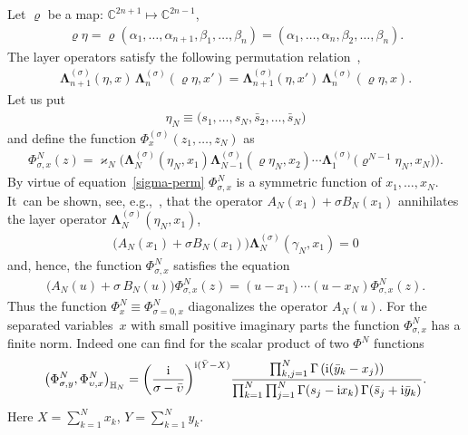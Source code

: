 \documentclass[pdftex]{sigma}%
\numberwithin{equation}{section}
\begin{document}
Let $\varrho$ be a map: $\mathbb C^{2n+1}\mapsto \mathbb C^{2n-1}$,
\begin{gather*}
\varrho\eta=\varrho(\alpha_1,\dots,\alpha_{n+1},\beta_{1},\dots,\beta_n)
=(\alpha_1,\dots,\alpha_n,\beta_{2},\dots,\beta_{n}).
\end{gather*}
The layer operators satisfy the following permutation relation~\cite{Belitsky:2014rba},
\begin{gather}\label{sigma-perm}
\boldsymbol\Lambda^{(\sigma)}_{n+1}(\eta,x)\,\boldsymbol\Lambda^{(\sigma)}_n(\varrho\eta,x')
 =\boldsymbol\Lambda^{(\sigma)}_{n+1}(\eta,x')\,\boldsymbol\Lambda^{(\sigma)}_n(\varrho\eta,x).
\end{gather}
Let us put
\begin{gather}\label{gammaNAB}
\eta_N\equiv\big( s_1,\dots, s_N, \bar s_2,\dots, \bar s_N\big)
\end{gather}
and define the function $\Phi^{(\sigma)}_{{x}}(z_1,\dots,z_N)$ as
\begin{gather*}%
 \Phi^{N}_{\sigma,{x}}(z)=\varkappa_N \Big( \boldsymbol\Lambda^{(\sigma)}_N(\eta_N, x_1)
 \boldsymbol\Lambda^{(\sigma)}_{N-1}(\varrho\eta_N, x_2)\cdots \boldsymbol\Lambda^{(\sigma)}_1\big(\varrho^{N-1}\eta_N, x_{N}\big)\Big).
\end{gather*}
By virtue of equation~\eqref{sigma-perm} $ \Phi^{N}_{\sigma,{x}} $ is a symmetric function of $x_1,\dots,x_N$. It~can be shown, see, e.g.,~\cite{Derkachov:2002tf}, that the operator $A_N(x_1)+\sigma B_N(x_1)$ annihilates the layer operator $
\boldsymbol\Lambda^{(\sigma)}_N(\eta_N, x_1)$,
\begin{gather*}
\big(A_N(x_1)+\sigma B_N(x_1)\big)\boldsymbol\Lambda^{(\sigma)}_N(\gamma_N, x_1)=0
\end{gather*}
and, hence, the function $\Phi^N_{\sigma,{x}}$ satisfies the equation
\begin{gather*}
\big(A_N(u)+\sigma\, B_N(u)\big)\Phi^N_{\sigma,{x}}( z)=
(u-x_1)\cdots(u-x_N)\Phi^N_{\sigma,{x}}( z).
\end{gather*}
Thus the function $\Phi^N_{{x}}\equiv\Phi^N_{\sigma=0,{x}}$ diagonalizes the operator $A_N(u)$.
 For the
separated variables~$x$ with small positive imaginary parts the function $\Phi^N_{\sigma,x}$ has a finite norm. Indeed one can find for the
scalar product of two $\Phi^N$ functions~\cite{Belitsky:2014rba}
\begin{gather}
\label{s-product-T}
\big(\Phi^N_{\sigma, y}, \Phi^N_{\upsilon, x}\big)_{\mathbb H_N} =
 \bigg(\frac {\rm i}{\sigma-\bar\upsilon}\bigg)^{{\rm i}(\bar Y-X)}
\frac{\prod_{k,j=1}^N \Gamma\left({\rm i}(\bar y_k-x_j)\right)
}{\prod_{k=1}^{N}\prod_{j=1}^N\Gamma( s_j-{\rm i}x_k)\,\Gamma(\bar s_j+ {\rm i}\bar y_k)}.
\end{gather}
Here $X=\sum_{k=1}^N x_k$, $Y=\sum_{k=1}^N y_k$.
\smallskip
\end{document}
